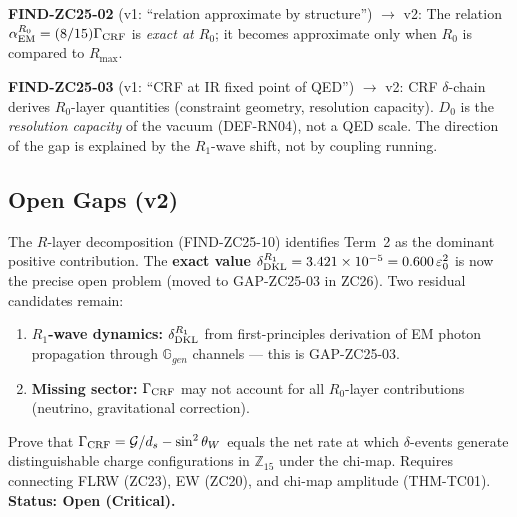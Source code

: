 \documentclass[12pt, a4paper]{article}
\begin{document}
\begin{derivedbox}[title={FIND-ZC25-02/03 (reframed v2):
  R-Layer Vocabulary}]
\textbf{FIND-ZC25-02} (v1: ``relation approximate by structure'')
$\to$ v2: The relation $\alpha_{\rm EM}^{R_0} = (8/15)\Gamma_{\rm CRF}$
is \emph{exact at $R_0$}; it becomes approximate only when
$R_0$ is compared to $R_{\max}$.

\medskip
\textbf{FIND-ZC25-03} (v1: ``CRF at IR fixed point of QED'')
$\to$ v2: CRF $\delta$-chain derives $R_0$-layer quantities
(constraint geometry, resolution capacity).
$D_0$ is the \emph{resolution capacity} of the vacuum (DEF-RN04),
not a QED scale. The direction of the gap is explained by the
$R_1$-wave shift, not by coupling running.
\end{derivedbox}

\subsection{Open Gaps (v2)}
\label{zc25:sec:gaps}

\begin{openqbox}[title={GAP-ZC25-01 (updated v2): Origin of
  $\delta_{\rm gap}$ --- Two Remaining Candidates}]
The $R$-layer decomposition (FIND-ZC25-10) identifies
Term~2 as the dominant positive contribution.
The \textbf{exact value} $\delta_{\rm DKL}^{R_1}
= 3.421\times10^{-5} = 0.600\,\varepsilon_0^2$ is now
the precise open problem (moved to GAP-ZC25-03 in ZC26).
Two residual candidates remain:
\begin{enumerate}[leftmargin=*, noitemsep]
  \item \textbf{$R_1$-wave dynamics:}
    $\delta_{\rm DKL}^{R_1}$ from first-principles derivation
    of EM photon propagation through $\mathbb{G}_{gen}$
    channels --- this is GAP-ZC25-03.
  \item \textbf{Missing sector:}
    $\Gamma_{\rm CRF}$ may not account for all $R_0$-layer
    contributions (neutrino, gravitational correction).
\end{enumerate}
\end{openqbox}

\begin{openqbox}[title={GAP-ZC25-02: Prove $\Gamma_{\rm CRF}$
  $=$ Chi-Map Coupling Amplitude (unchanged)}]
Prove that $\Gamma_{\rm CRF} = \mathcal{G}/d_s - \sin^2\theta_W$
equals the net rate at which $\delta$-events generate
distinguishable charge configurations in $\mathbb{Z}_{15}$
under the chi-map. Requires connecting FLRW (ZC23), EW (ZC20),
and chi-map amplitude (THM-TC01). \textbf{Status: Open (Critical).}
\end{openqbox}
\end{document}
